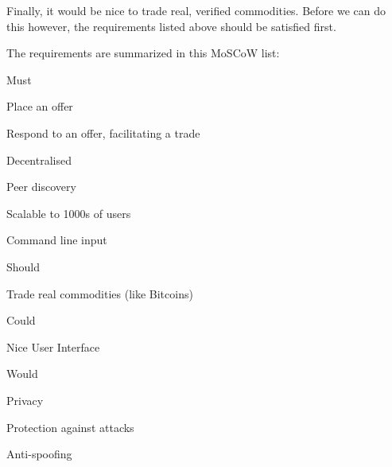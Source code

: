 Finally, it would be nice to trade real, verified commodities.
Before we can do this however, the requirements listed above should be satisfied first.

\newpage

The requirements are summarized in this MoSCoW list:

\begin{myitemize}
\item Must
\begin{myitemize}
	\item Place an offer
	\item Respond to an offer, facilitating a trade
    \item Decentralised
    \item Peer discovery
    \item Scalable to 1000s of users
    \item Command line input
\end{myitemize}
\item Should
\begin{myitemize}
	\item Trade real commodities (like Bitcoins)
\end{myitemize}
\item Could
\begin{myitemize}
	\item Nice User Interface
\end{myitemize}
\item Would
\begin{myitemize}
	\item Privacy
	\item Protection against attacks
	\item Anti-spoofing
\end{myitemize}
\end{myitemize}